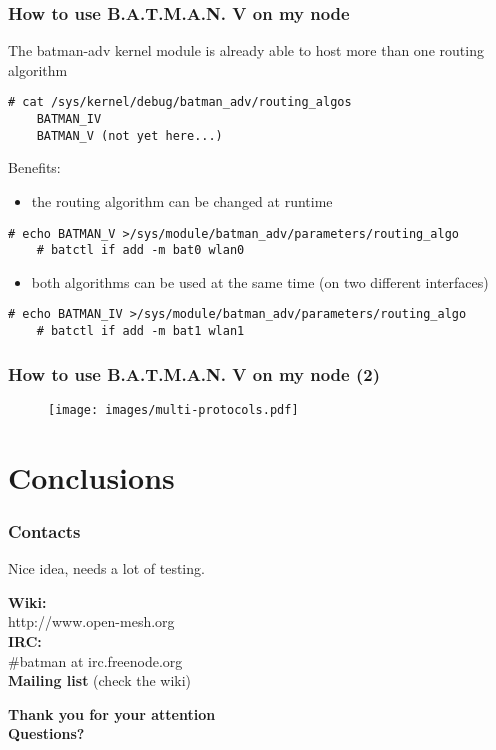 \documentclass[slidestop]{beamer}
\begin{document}
\begin{frame}[c,fragile]
	\frametitle{How to use B.A.T.M.A.N. V on my node}
	The batman-adv kernel module is already able to host more than one
	routing algorithm
	\pause
	\begin{lstlisting}[basicstyle=\scriptsize]
	# cat /sys/kernel/debug/batman_adv/routing_algos
	BATMAN_IV
	BATMAN_V (not yet here...)
	\end{lstlisting}
	\pause
	Benefits:
	\begin{itemize}
		\item the routing algorithm can be changed at runtime
	\end{itemize}
	\pause
	\begin{lstlisting}[basicstyle=\scriptsize]
	# echo BATMAN_V >/sys/module/batman_adv/parameters/routing_algo
	# batctl if add -m bat0 wlan0
	\end{lstlisting}
	\pause
	\begin{itemize}
		\item both algorithms can be used at the same time (on two
			different interfaces)
	\end{itemize}
	\begin{lstlisting}[basicstyle=\scriptsize]
	# echo BATMAN_IV >/sys/module/batman_adv/parameters/routing_algo
	# batctl if add -m bat1 wlan1
	\end{lstlisting}

\end{frame}

\begin{frame}[c]
	\frametitle{How to use B.A.T.M.A.N. V on my node (2)}
	\begin{figure}
		\centering
		\texttt{[image: images/multi-protocols.pdf]}
	\end{figure}
\end{frame}

\section{Conclusions}
\begin{frame}
	\frametitle{Contacts}
	Nice idea, needs a lot of testing.

	\textbf{Wiki:}\\
	http://www.open-mesh.org\\
	\textbf{IRC:}\\
	\#batman at irc.freenode.org\\
	\textbf{Mailing list} (check the wiki)
\end{frame}

\begin{frame}[c]
	\begin{center}
	\Large{\textbf{Thank you for your attention\\[1cm]
	Questions?}}
	\end{center}
\end{frame}
\end{document}
